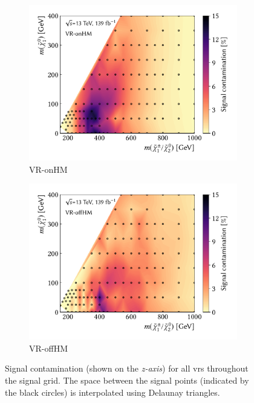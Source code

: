 \begin{figure}
\begin{subfigure}[b]{0.5\linewidth}
		\centering\includegraphics[width=1.0\textwidth]{signal_contamination/plot_VR_onHM}
		\caption{VR-onHM\label{fig:signal_contaminations_VRon3}}
	\end{subfigure}\hfill
	\begin{subfigure}[b]{0.5\linewidth}
		\centering\includegraphics[width=1.0\textwidth]{signal_contamination/plot_VR_offHM}
		\caption{VR-offHM\label{fig:signal_contaminations_VRoff3}}
	\end{subfigure}\hfill

	\caption{Signal contamination (shown on the \textit{z-axis}) for all \glspl{vr} throughout the signal grid. The space between the signal points (indicated by the black circles) is interpolated using Delaunay triangles.}
	\label{fig:signal_contaminations_VRs}
\end{figure}



